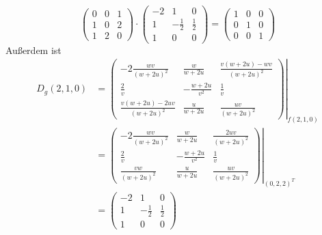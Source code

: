 \documentclass{article}
\theoremstyle{definition}
\begin{document}
\[
	\begin{pmatrix}
		0 & 0 & 1\\[0.3em]
		1 & 0 & 2\\[0.3em]
		1 & 2 & 0
	\end{pmatrix} \cdot \begin{pmatrix}
		-2 & 1 & 0\\[0.3em]
		1 & -\frac{1}{2} & \frac{1}{2}\\[0.3em]
		1 & 0 & 0
	\end{pmatrix} = \begin{pmatrix}
		1 & 0 & 0\\[0.3em]
		0 & 1 & 0\\[0.3em]
		0 & 0 & 1
	\end{pmatrix}	
\]
Außerdem ist 
\begin{align*}
	D_g(2,1,0) &= \left.\begin{pmatrix}
		-2\frac{wv}{(w+2u)^2} & \frac{w}{w+2u} & \frac{v(w+2u)-wv}{(w+2u)^2}\\[0.3em]
		\frac{2}{v} & -\frac{w+2u}{v^2} & \frac{1}{v}\\[0.3em]
		\frac{v(w+2u)-2uv}{(w+2u)^2} & \frac{u}{w+2u} & \frac{uv}{(w+2u)^2}
	\end{pmatrix}\right|_{f(2,1,0)}\\
	&= \left.\begin{pmatrix}
		-2\frac{wv}{(w+2u)^2} & \frac{w}{w+2u} & \frac{2uv}{(w+2u)^2}\\[0.3em]
		\frac{2}{v} & -\frac{w+2u}{v^2} & \frac{1}{v}\\[0.3em]
		\frac{vw}{(w+2u)^2} & \frac{u}{w+2u} & \frac{uv}{(w+2u)^2}
	\end{pmatrix}\right|_{(0,2,2)^T}\\
	&= \begin{pmatrix}
		-2 & 1 & 0\\[0.3em]
		1 & -\frac{1}{2} & \frac{1}{2}\\[0.3em]
		1 & 0 & 0
	\end{pmatrix}
\end{align*}
\end{document}
